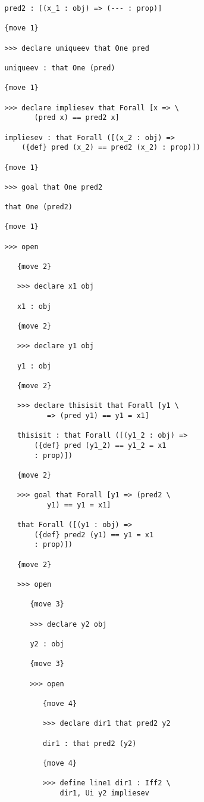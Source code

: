 \documentclass[12pt]{article}
\begin{document}
\begin{verbatim}
   pred2 : [(x_1 : obj) => (--- : prop)]

   {move 1}

   >>> declare uniqueev that One pred

   uniqueev : that One (pred)

   {move 1}

   >>> declare impliesev that Forall [x => \
          (pred x) == pred2 x]

   impliesev : that Forall ([(x_2 : obj) => 
       ({def} pred (x_2) == pred2 (x_2) : prop)])

   {move 1}

   >>> goal that One pred2

   that One (pred2)

   {move 1}

   >>> open

      {move 2}

      >>> declare x1 obj

      x1 : obj

      {move 2}

      >>> declare y1 obj

      y1 : obj

      {move 2}

      >>> declare thisisit that Forall [y1 \
             => (pred y1) == y1 = x1]

      thisisit : that Forall ([(y1_2 : obj) => 
          ({def} pred (y1_2) == y1_2 = x1 
          : prop)])

      {move 2}

      >>> goal that Forall [y1 => (pred2 \
             y1) == y1 = x1]

      that Forall ([(y1 : obj) => 
          ({def} pred2 (y1) == y1 = x1 
          : prop)])

      {move 2}

      >>> open

         {move 3}

         >>> declare y2 obj

         y2 : obj

         {move 3}

         >>> open

            {move 4}

            >>> declare dir1 that pred2 y2

            dir1 : that pred2 (y2)

            {move 4}

            >>> define line1 dir1 : Iff2 \
                dir1, Ui y2 impliesev


\end{verbatim}
\end{document}
